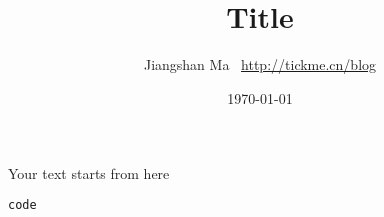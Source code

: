 \documentclass[a4paper,11pt,final]{article}
\title{Title}
\author{Jiangshan Ma \ \url{http://tickme.cn/blog}}
\date{\today}
\begin{document}
\maketitle
Your text starts from here
\begin{lstlisting}[language=bash]
code
\end{lstlisting}
\end{document}
